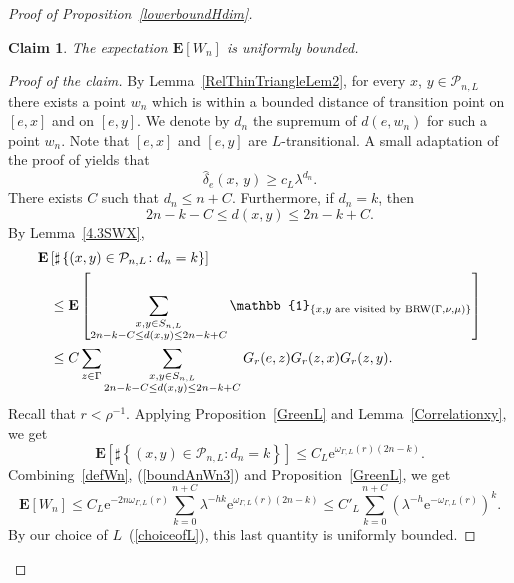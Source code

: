 \documentclass{amsart}
\newtheorem*{claim}{Claim}
\theoremstyle{definition}
\theoremstyle{remark}
\begin{document}
\begin{proof}[Proof of Proposition~\ref{lowerboundHdim}]
\begin{claim}
  \label{boundWn}
The expectation $\mathbf{E}[W_n]$ is uniformly bounded.
\end{claim}

\begin{proof}[Proof of the claim]
  By Lemma~\ref{RelThinTriangleLem2}, for every $x$, $y \in \mathcal{P}_{n, L}$ there exists a point $w_n$ which is within a bounded distance of transition point on $[e, x]$ and on $[e, y]$.  We denote by $d_n$ the supremum of $d(e,w_n)$ for such a point $w_n$.  Note that $[e, x]$ and $[e, y]$ are $L$-transitional.  A small adaptation of the proof of \cite[Proposition~5.13]{PY} yields that
  \[
    \hat{\delta}_e(x, \, y) \geq c_L \lambda^{d_n}.  
  \]
  There exists $C$ such that $d_n\leq n+C$.  Furthermore, if $d_n = k$, then
  $$2 n - k - C \leq d(x, y) \leq 2n - k + C.$$
  By Lemma~\ref{4.3SWX},
  \begin{align*}
    & \mathbf{E} \left[ \sharp \left\{ (x, y) \in \mathcal{P}_{n, L} \colon d_n = k \right\} \right] \\
    & \hspace{.3cm} \leq
          \mathbf{E} \left[ \sum_{\substack{x, y \in S_{n, L} \\ 2n - k - C \leq d(x, y) \leq 2n - k + C}} \mathbb{1}_{\left\{ x, y \text{ are visited by }\mathrm{BRW}(\Gamma,\nu,\mu) \right\}} \right] \\
    & \hspace{.3cm} \leq 
           C \sum_{z \in \Gamma} \sum_{\substack{x, y \in S_{n, L} \\ 2n - k - C \leq d(x, y) \leq 2n - k + C}} G_r(e, z) G_r(z, x) G_r(z, y). 
  \end{align*}
Recall that $r<\rho^{-1}$.
Applying Proposition~\ref{GreenL} and Lemma~\ref{Correlationxy}, we get
\begin{equation}\label{boundAnWn3}
  \mathbf{E} \left[ \sharp \left\{ (x, y) \in \mathcal{P}_{n, L} \colon d_n = k \right\} \right] 
  \leq
  C_L \mathrm{e}^{\omega_{\Gamma,L}(r)(2n-k)}.
\end{equation}
Combining~\eqref{defWn}, (\ref{boundAnWn3}) and Proposition~\ref{GreenL}, we get
$$\mathbf{E}[W_n]\leq C_L\mathrm{e}^{-2n\omega_{\Gamma,L}(r)}\sum_{k=0}^{n+C}\lambda^{-hk}\mathrm{e}^{\omega_{\Gamma,L}(r)(2n-k)}\leq C'_L\sum_{k=0}^{n+C}(\lambda^{-h}\mathrm{e}^{-\omega_{\Gamma,L}(r)})^k.$$
By our choice of $L$~(\ref{choiceofL}), this last quantity is uniformly bounded.
\end{proof}


\end{proof}
\end{document}
